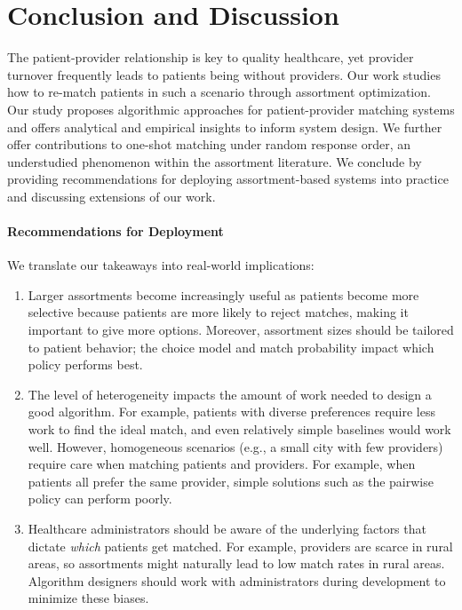 \section{Conclusion and Discussion}
\label{sec:discussion}
The patient-provider relationship is key to quality healthcare, yet provider turnover frequently leads to patients being without providers. 
Our work studies how to re-match patients in such a scenario through assortment optimization. 
Our study proposes algorithmic approaches for patient-provider matching systems and offers analytical and empirical insights to inform system design.
We further offer contributions to one-shot matching under random response order, an understudied phenomenon within the assortment literature.
We conclude by providing recommendations for deploying assortment-based systems into practice and discussing extensions of our work. 

\paragraph{Recommendations for Deployment}
We translate our takeaways into real-world implications: 
\begin{enumerate}
    \item  Larger assortments become increasingly useful as patients become more selective because patients are more likely to reject matches, making it important to give more options. 
    Moreover, assortment sizes should be tailored to patient behavior; the choice model and match probability impact which policy performs best. 
    \item The level of heterogeneity impacts the amount of work needed to design a good algorithm. 
    For example, patients with diverse preferences require less work to find the ideal match, and even relatively simple baselines would work well. 
    However, homogeneous scenarios (e.g., a small city with few providers) require care when matching patients and providers. For example, when patients all prefer the same provider, simple solutions such as the pairwise policy can perform poorly. 
    \item Healthcare administrators should be aware of the underlying factors that dictate \textit{which} patients get matched. For example, providers are scarce in rural areas, so assortments might naturally lead to low match rates in rural areas. Algorithm designers should work with administrators during development to minimize these biases.   
\end{enumerate}


